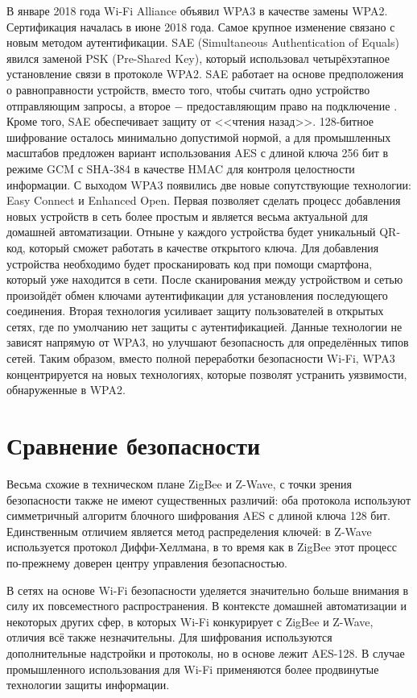 	В январе 2018 года Wi-Fi Alliance объявил WPA3 в качестве замены WPA2. Сертификация началась в июне 
	2018 года. Самое крупное изменение связано с новым методом аутентификации. SAE (Simultaneous 
	Authentication of Equals) явился заменой PSK (Pre-Shared Key), который использовал четырёхэтапное 
	установление связи в протоколе WPA2. SAE работает на основе предположения о равноправности 
	устройств, вместо того, чтобы считать одно устройство отправляющим запросы, а второе $-$ предоставляющим 
	право на подключение \cite{802.11-2016}.  Кроме того, SAE обеспечивает защиту от <<чтения назад>>. 128-битное шифрование
	осталось минимально допустимой нормой, а для промышленных масштабов предложен вариант использования
	AES с длиной ключа 256 бит в режиме GCM с SHA-384 в качестве HMAC для контроля целостности информации.
	С выходом WPA3 появились две новые сопутствующие технологии: Easy Connect  и Enhanced Open. Первая
	позволяет сделать процесс добавления новых устройств в сеть более простым и является весьма актуальной
	для домашней автоматизации. Отныне у каждого устройства будет уникальный QR-код, который сможет
	работать в качестве открытого ключа. Для добавления устройства необходимо будет просканировать код 
	при помощи смартфона, который уже находится в сети. После сканирования между устройством и сетью 
	произойдёт обмен ключами аутентификации для установления последующего соединения.
	Вторая технология усиливает защиту пользователей в открытых сетях, где по умолчанию нет защиты с
	аутентификацией.
	Данные технологии не зависят напрямую от WPA3, но улучшают безопасность для определённых типов сетей.
	Таким образом, вместо полной переработки безопасности Wi-Fi, WPA3 концентрируется на новых технологиях, 
	которые позволят устранить уязвимости, обнаруженные в WPA2.
	
	
	\section{Сравнение безопасности}
	Весьма схожие в техническом плане ZigBee и Z-Wave, с точки зрения безопасности также не имеют
	существенных различий: оба протокола используют симметричный алгоритм блочного шифрования
	AES с длиной ключа 128 бит. Единственным отличием является метод распределения ключей: в Z-Wave
	используется протокол Диффи-Хеллмана, в то время как в ZigBee этот процесс по-прежнему доверен
	центру управления безопасностью.
	
	В сетях на основе Wi-Fi безопасности уделяется значительно больше внимания в силу их повсеместного
	распространения. В контексте домашней автоматизации и некоторых других сфер, в которых Wi-Fi
	конкурирует с ZigBee и Z-Wave, отличия всё также незначительны. Для шифрования используются
	дополнительные надстройки и протоколы, но в основе лежит AES-128. В случае промышленного
	использования для Wi-Fi применяются более продвинутые технологии защиты информации.
	